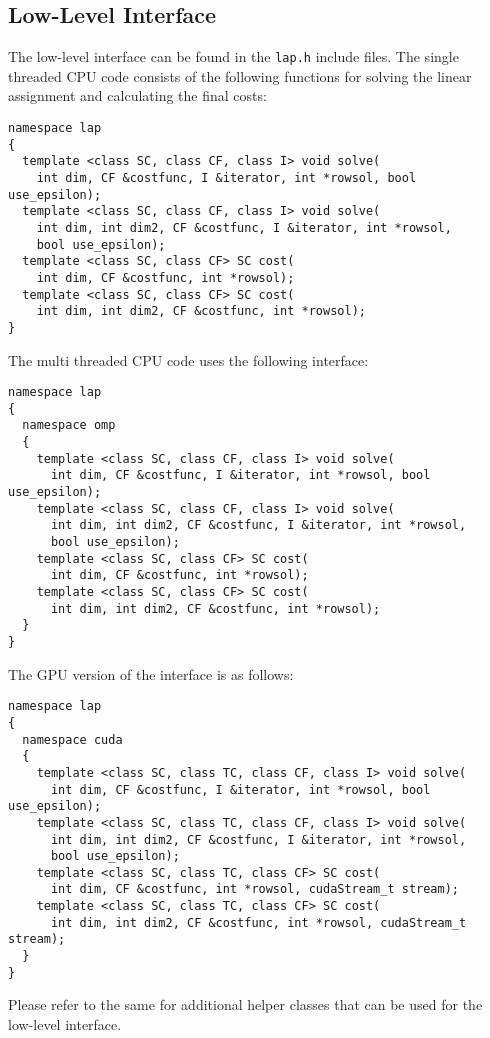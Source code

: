 \documentclass[format=acmsmall,review=false, screen=true]{acmart}
\begin{document}
\subsection{Low-Level Interface}
The low-level interface can be found in the \texttt{lap.h} include files. The single threaded CPU code consists of the following functions for solving the linear assignment and calculating the final costs:
\begin{verbatim}
namespace lap
{
  template <class SC, class CF, class I> void solve(
    int dim, CF &costfunc, I &iterator, int *rowsol, bool use_epsilon);
  template <class SC, class CF, class I> void solve(
    int dim, int dim2, CF &costfunc, I &iterator, int *rowsol,
    bool use_epsilon);
  template <class SC, class CF> SC cost(
    int dim, CF &costfunc, int *rowsol);
  template <class SC, class CF> SC cost(
    int dim, int dim2, CF &costfunc, int *rowsol);
}
\end{verbatim}
The multi threaded CPU code uses the following interface:
\begin{verbatim}
namespace lap
{
  namespace omp
  {
    template <class SC, class CF, class I> void solve(
      int dim, CF &costfunc, I &iterator, int *rowsol, bool use_epsilon);
    template <class SC, class CF, class I> void solve(
      int dim, int dim2, CF &costfunc, I &iterator, int *rowsol,
      bool use_epsilon);
    template <class SC, class CF> SC cost(
      int dim, CF &costfunc, int *rowsol);
    template <class SC, class CF> SC cost(
      int dim, int dim2, CF &costfunc, int *rowsol);
  }
}
\end{verbatim}
The GPU version of the interface is as follows:
\begin{verbatim}
namespace lap
{
  namespace cuda
  {
    template <class SC, class TC, class CF, class I> void solve(
      int dim, CF &costfunc, I &iterator, int *rowsol, bool use_epsilon);
    template <class SC, class TC, class CF, class I> void solve(
      int dim, int dim2, CF &costfunc, I &iterator, int *rowsol,
      bool use_epsilon);
    template <class SC, class TC, class CF> SC cost(
      int dim, CF &costfunc, int *rowsol, cudaStream_t stream);
    template <class SC, class TC, class CF> SC cost(
      int dim, int dim2, CF &costfunc, int *rowsol, cudaStream_t stream);
  }
}
\end{verbatim}

Please refer to the same for additional helper classes that can be used for the low-level interface.

%
%
%
%
%
%
%

%
%
\end{document}
